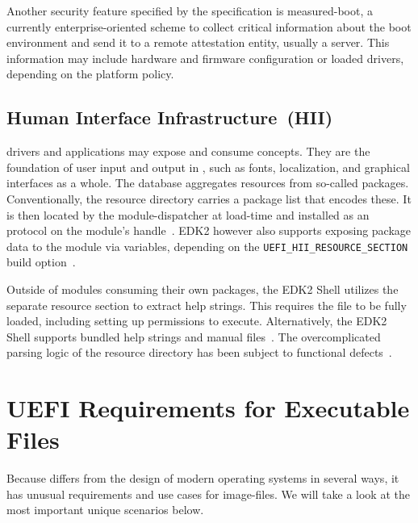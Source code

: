 Another security feature specified by the  specification is \gls{measured-boot}, a currently enterprise-oriented scheme to collect critical information about the boot environment and send it to a remote attestation entity, usually a server. This information may include hardware and \gls{firmware} configuration or loaded drivers, depending on the platform policy.

\subsection{Human Interface Infrastructure~(HII)}

 drivers and applications may expose and consume  concepts. They are the foundation of user input and output in , such as fonts, localization, and graphical interfaces as a whole. The  database aggregates resources from so-called  packages. Conventionally, the  resource directory carries a  package list that encodes these. It is then located by the \gls{module-dispatcher} at load-time and installed as an  protocol on the module's  handle~\cite{uefi-spec}. \Gls{EDK2} however also supports exposing  package data to the module via  variables, depending on the \lstinline{UEFI_HII_RESOURCE_SECTION} build option~\cite{edk2-module-writers,edk2}.

Outside of modules consuming their own  packages, the \gls{EDK2} Shell utilizes the separate  resource section to extract help strings. This requires the  file to be fully loaded, including setting up permissions to execute. Alternatively, the \gls{EDK2} Shell supports bundled help strings and manual files~\cite{edk2}. The overcomplicated parsing logic of the  resource directory has been subject to functional defects~\cite{secure-pe}.

\section{UEFI Requirements for Executable Files}
\label{sec:uefi_exec}

Because  differs from the design of modern operating systems in several ways, it has unusual requirements and use cases for \glspl{image-file}. We will take a look at the most important unique scenarios below.

